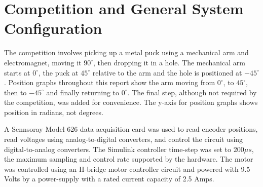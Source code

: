 \section{Competition and General System Configuration} 
\label{sec:competition}

The competition %
involves picking up a metal puck using a mechanical arm and electromagnet, moving it $90^\circ$, then dropping it in a hole. 
The mechanical arm starts at $0^\circ$, the puck at $45^\circ$ relative to the arm and the hole is positioned at $-45^\circ$.
Position graphs throughout this report show the arm moving from $0^\circ$, to $45^\circ$, then to $-45^\circ$ and finally returning to $0^\circ$.
The final step, although not required by the competition, was added for convenience. 
The y-axis for position graphs shows position in radians, not degrees.

A Sennsoray Model 626 data acquisition card was used to read encoder positions, read voltages using analog-to-digital converters, and control the circuit using digital-to-analog converters.
The Simulink controller time-step was set to $200 \mu s$, the maximum sampling and control rate supported by the hardware.
The motor was controlled using an H-bridge %
motor controller circuit and powered with 9.5 Volts by a power-supply with a rated current capacity of 2.5 Amps.
